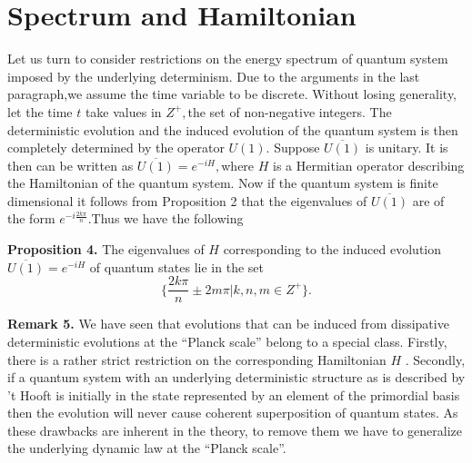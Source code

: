 \documentclass[a4paper,12pt]{article}
\begin{document}
\section{Spectrum and Hamiltonian}

Let us turn to consider restrictions on the energy spectrum of quantum
system imposed by the underlying determinism. Due to the arguments in the
last paragraph,we assume the time variable to be discrete. Without losing
generality, let the time $t$ take values in $Z^{+},$the set of non-negative
integers. The deterministic evolution and the induced evolution of the
quantum system is then completely determined by the operator $U(1).$ Suppose
$\overline{U(1)}$ is unitary. It is then can be written as $\overline{U(1)}%
=e^{-iH},$where $H$ is a Hermitian operator describing the Hamiltonian of
the quantum system. Now if the quantum system is finite dimensional it
follows from Proposition 2 that the eigenvalues of $\overline{U(1)}$ are of
the form $e^{-i\frac{2k\pi }n}.$Thus we have the following

\textbf{Proposition 4.} The eigenvalues of $H$ corresponding to the induced
evolution $\overline{U(1)}=e^{-iH}$ of quantum states lie in the set
\[
\{\frac{2k\pi }n\pm 2m\pi |k,n,m\in Z^{+}\}.
\]

\textbf{Remark 5.} We have seen that evolutions that can be induced from
dissipative deterministic evolutions at the ``Planck scale'' belong to a
special class. Firstly, there is a rather strict restriction on the
corresponding Hamiltonian $H$ . Secondly, if a quantum system with an
underlying deterministic structure as is described by 't Hooft is initially
in the state represented by an element of the primordial basis then the
evolution will never cause coherent superposition of quantum states. As
these drawbacks are inherent in the theory, to remove them we have to
generalize the underlying dynamic law at the ``Planck scale''.
\end{document}
